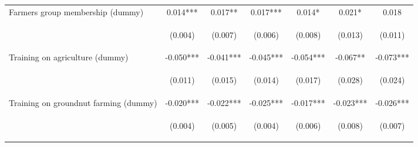 \begin{center}
\begin{tabular}{lcccccc}
Farmers group membership (dummy) & 0.014*** & 0.017** & 0.017*** & 0.014* & 0.021* & 0.018 \\
\vspace{4pt} & \begin{footnotesize}(0.004)\end{footnotesize} & \begin{footnotesize}(0.007)\end{footnotesize} & \begin{footnotesize}(0.006)\end{footnotesize} & \begin{footnotesize}(0.008)\end{footnotesize} & \begin{footnotesize}(0.013)\end{footnotesize} & \begin{footnotesize}(0.011)\end{footnotesize} \\
Training on agriculture (dummy) & -0.050*** & -0.041*** & -0.045*** & -0.054*** & -0.067** & -0.073*** \\
\vspace{4pt} & \begin{footnotesize}(0.011)\end{footnotesize} & \begin{footnotesize}(0.015)\end{footnotesize} & \begin{footnotesize}(0.014)\end{footnotesize} & \begin{footnotesize}(0.017)\end{footnotesize} & \begin{footnotesize}(0.028)\end{footnotesize} & \begin{footnotesize}(0.024)\end{footnotesize} \\
Training on groundnut farming (dummy) & -0.020*** & -0.022*** & -0.025*** & -0.017*** & -0.023*** & -0.026*** \\
\vspace{4pt} & \begin{footnotesize}(0.004)\end{footnotesize} & \begin{footnotesize}(0.005)\end{footnotesize} & \begin{footnotesize}(0.004)\end{footnotesize} & \begin{footnotesize}(0.006)\end{footnotesize} & \begin{footnotesize}(0.008)\end{footnotesize} & \begin{footnotesize}(0.007)\end{footnotesize} \\

\end{tabular}
\end{center}
